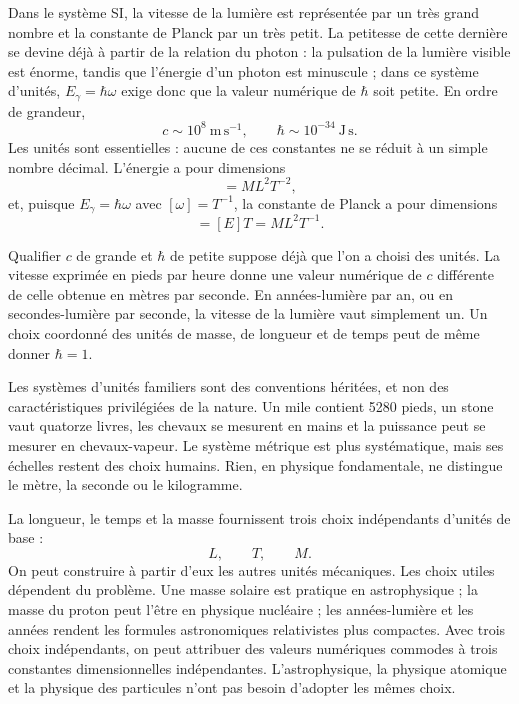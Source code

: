 Dans le système SI, la vitesse de la lumière est représentée par un très grand nombre et la constante de Planck par un très petit. La petitesse de cette dernière se devine déjà à partir de la relation du photon : la pulsation de la lumière visible est énorme, tandis que l’énergie d’un photon est minuscule ; dans ce système d’unités, \(E_\gamma=\hbar\omega\) exige donc que la valeur numérique de \(\hbar\) soit petite. En ordre de grandeur,
\begin{equation}
c\sim 10^8\ \mathrm{m\,s^{-1}},
\qquad
\hbar\sim 10^{-34}\ \mathrm{J\,s}.
\end{equation}
Les unités sont essentielles : aucune de ces constantes ne se réduit à un simple nombre décimal. L’énergie a pour dimensions
\begin{equation}
[E]=M L^2 T^{-2},
\end{equation}
et, puisque \(E_\gamma=\hbar\omega\) avec \([\omega]=T^{-1}\), la constante de Planck a pour dimensions
\begin{equation}
[\hbar]=[E]T=M L^2 T^{-1}.
\end{equation}

Qualifier \(c\) de grande et \(\hbar\) de petite suppose déjà que l’on a choisi des unités. La vitesse exprimée en pieds par heure donne une valeur numérique de \(c\) différente de celle obtenue en mètres par seconde. En années-lumière par an, ou en secondes-lumière par seconde, la vitesse de la lumière vaut simplement un. Un choix coordonné des unités de masse, de longueur et de temps peut de même donner \(\hbar=1\).

Les systèmes d’unités familiers sont des conventions héritées, et non des caractéristiques privilégiées de la nature. Un mile contient 5280 pieds, un stone vaut quatorze livres, les chevaux se mesurent en mains et la puissance peut se mesurer en chevaux-vapeur. Le système métrique est plus systématique, mais ses échelles restent des choix humains. Rien, en physique fondamentale, ne distingue le mètre, la seconde ou le kilogramme.

La longueur, le temps et la masse fournissent trois choix indépendants d’unités de base :
\begin{equation}
L,\qquad T,\qquad M.
\end{equation}
On peut construire à partir d’eux les autres unités mécaniques. Les choix utiles dépendent du problème. Une masse solaire est pratique en astrophysique ; la masse du proton peut l’être en physique nucléaire ; les années-lumière et les années rendent les formules astronomiques relativistes plus compactes. Avec trois choix indépendants, on peut attribuer des valeurs numériques commodes à trois constantes dimensionnelles indépendantes. L’astrophysique, la physique atomique et la physique des particules n’ont pas besoin d’adopter les mêmes choix.

